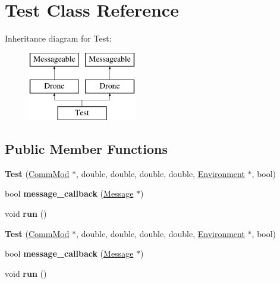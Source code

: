 \hypertarget{class_test}{}\section{Test Class Reference}
\label{class_test}
Inheritance diagram for Test\+:\begin{figure}[H]
\begin{center}
\leavevmode
\includegraphics[height=3.000000cm]{class_test}
\end{center}
\end{figure}
\subsection*{Public Member Functions}
\begin{DoxyCompactItemize}
\item 
{\bfseries Test} (\hyperlink{class_comm_mod}{Comm\+Mod} $\ast$, double, double, double, double, \hyperlink{class_environment}{Environment} $\ast$, bool)\hypertarget{class_test_a259deb1209d5244638f0a8af0095ea6c}{}\label{class_test_a259deb1209d5244638f0a8af0095ea6c}

\item 
bool {\bfseries message\+\_\+callback} (\hyperlink{class_message}{Message} $\ast$)\hypertarget{class_test_a74465f79ce672229db021c71f3b4eda4}{}\label{class_test_a74465f79ce672229db021c71f3b4eda4}

\item 
void {\bfseries run} ()\hypertarget{class_test_abb64a8b970de8b2422b9f56cd8719ca4}{}\label{class_test_abb64a8b970de8b2422b9f56cd8719ca4}

\item 
{\bfseries Test} (\hyperlink{class_comm_mod}{Comm\+Mod} $\ast$, double, double, double, double, \hyperlink{class_environment}{Environment} $\ast$, bool)\hypertarget{class_test_a259deb1209d5244638f0a8af0095ea6c}{}\label{class_test_a259deb1209d5244638f0a8af0095ea6c}

\item 
bool {\bfseries message\+\_\+callback} (\hyperlink{class_message}{Message} $\ast$)\hypertarget{class_test_a74465f79ce672229db021c71f3b4eda4}{}\label{class_test_a74465f79ce672229db021c71f3b4eda4}

\item 
void {\bfseries run} ()\hypertarget{class_test_abb64a8b970de8b2422b9f56cd8719ca4}{}\label{class_test_abb64a8b970de8b2422b9f56cd8719ca4}

\end{DoxyCompactItemize}
